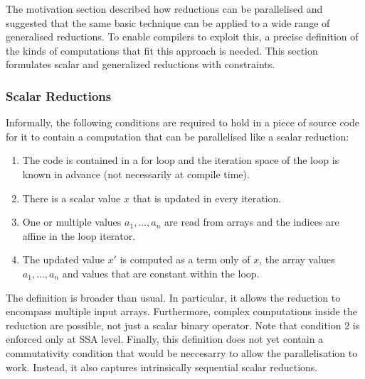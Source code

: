     The motivation section described how reductions can be parallelised and
    suggested that the same basic technique can be applied to a wide range of
    generalised reductions.
    To enable compilers to exploit this, a precise definition of the kinds
    of computations that fit this approach is needed.
    This section formulates scalar and generalized reductions with constraints.

\subsubsection{Scalar Reductions}

    Informally, the following conditions are required to hold in a piece of
    source code for it to contain a computation that can be parallelised like a
    scalar reduction:
    \begin{enumerate}
        \item The code is contained in a for loop and the iteration space of the
              loop is known in advance (not necessarily at compile time).
        \item There is a scalar value $x$ that is updated in every iteration.
        \item One or multiple values $a_1,\dots,a_n$ are read from arrays and
              the indices are affine in the loop iterator.
        \item The updated value $x'$ is computed as a term only of $x$, the
              array values $a_1,\dots,a_n$ and values that are constant within
              the loop.
    \end{enumerate}

    The definition is broader than usual.
    In particular, it allows the reduction to encompass multiple input arrays.
    Furthermore, complex computations inside the reduction are possible, not
    just a scalar binary operator.
    Note that condition 2 is enforced only at SSA level.
    Finally, this definition does not yet contain a commutativity condition that
    would be neccesarry to allow the parallelisation to work.
    Instead, it also captures intrinsically sequential scalar reductions.

